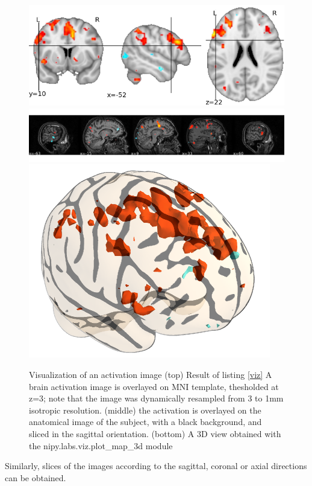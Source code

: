 \documentclass{bioinfo}
\begin{document}
\noindent
\hspace*{-.5cm}

\begin{figure}
\begin{center}
\includegraphics[width=\linewidth]{Figures/ortho_view.png}
\includegraphics[width=\linewidth]{Figures/x_view.png}
\includegraphics[width=.6\linewidth]{Figures/viz_3d.png}
\end{center}
\caption{Visualization of an activation image (top) Result of listing \ref{viz} A brain activation image is
  overlayed on MNI template, thesholded at z=3; note that the image
  was dynamically resampled from 3 to 1mm isotropic resolution.
(middle) the activation is overlayed on the anatomical image of the subject, with a black background, and sliced in the sagittal orientation.
(bottom) A 3D view obtained with the nipy.labs.viz.plot\_map\_3d module}
\label{fig:viz}
\end{figure}

Similarly, slices of the images according to the sagittal, coronal or
axial directions can be obtained.
\end{document}
